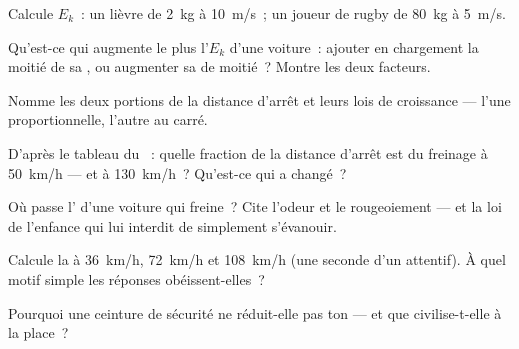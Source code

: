 \begin{exercise}[$\star$]\label{exo:g9:kinetic-energy-safety:2}
Calcule $E_k$~: un lièvre de \qty{2}{kg} à \qty{10}{m/s}~; un joueur
de rugby de \qty{80}{kg} à \qty{5}{m/s}.
\end{exercise}

\begin{exercise}[$\star$]\label{exo:g9:kinetic-energy-safety:3}
Qu'est-ce qui augmente le plus l'$E_k$ d'une voiture~: ajouter en
chargement la moitié de sa , ou augmenter sa  de moitié~?
Montre les deux facteurs.
\end{exercise}

\begin{exercise}[$\star$]\label{exo:g9:kinetic-energy-safety:4}
Nomme les deux portions de la distance d'arrêt et leurs lois de
croissance --- l'une proportionnelle, l'autre au carré.
\end{exercise}

\begin{exercise}[$\star$]\label{exo:g9:kinetic-energy-safety:5}
D'après le tableau du ~: quelle fraction de la distance
d'arrêt est du freinage à \qty{50}{km/h} --- et à \qty{130}{km/h}~?
Qu'est-ce qui a changé~?
\end{exercise}

\begin{exercise}[$\star$]\label{exo:g9:kinetic-energy-safety:6}
Où passe l' d'une voiture qui freine~? Cite l'odeur
et le rougeoiement --- et la loi de l'enfance qui lui interdit de
simplement s'évanouir.
\end{exercise}

\begin{exercise}[$\star$]\label{exo:g9:kinetic-energy-safety:7}
Calcule la  à \qty{36}{km/h}, \qty{72}{km/h} et
\qty{108}{km/h} (une seconde d'un  attentif). À quel motif
simple les réponses obéissent-elles~?
\end{exercise}

\begin{exercise}[$\star$]\label{exo:g9:kinetic-energy-safety:8}
Pourquoi une ceinture de sécurité ne réduit-elle pas ton  --- et que civilise-t-elle à la place~?
\end{exercise}

